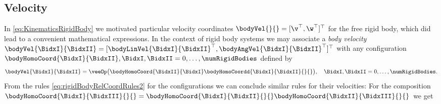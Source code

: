 \subsection{Velocity}\label{sec:RBSVelocity}
In \eqref{eq:KinematicsRigidBody} we motivated particular velocity coordinates $\bodyVel{}{} = [\v^\top, \w^\top]^\top$ for the free rigid body, which did lead to a convenient mathematical expressions.
In the context of rigid body systems we may associate a \textit{body velocity} $\bodyVel{\BidxI}{\BidxII} = [\bodyLinVel{\BidxI}{\BidxII}^\top, \bodyAngVel{\BidxI}{\BidxII}^\top]^\top$ with any configuration $\bodyHomoCoord{\BidxI}{\BidxII}, \BidxI,\BidxII = 0,\ldots,\numRigidBodies$ defined by 
\begin{align}\label{eq:DefBodyVelocityMulti}
 \bodyVel{\BidxI}{\BidxII} = \veeOp\big(\bodyHomoCoord{\BidxII}{\BidxI} \bodyHomoCoordd{\BidxI}{\BidxII}{}{} \big), \quad \BidxI,\BidxII = 0,\ldots,\numRigidBodies.
\end{align}
From the rules \eqref{eq:rigidBodyRelCoordRules2} for the configurations we can conclude similar rules for their velocities:
For the composition $\bodyHomoCoord{\BidxI}{\BidxIII}{}{} = \bodyHomoCoord{\BidxI}{\BidxII}{}{} \bodyHomoCoord{\BidxII}{\BidxIII}{}{}$ we get
